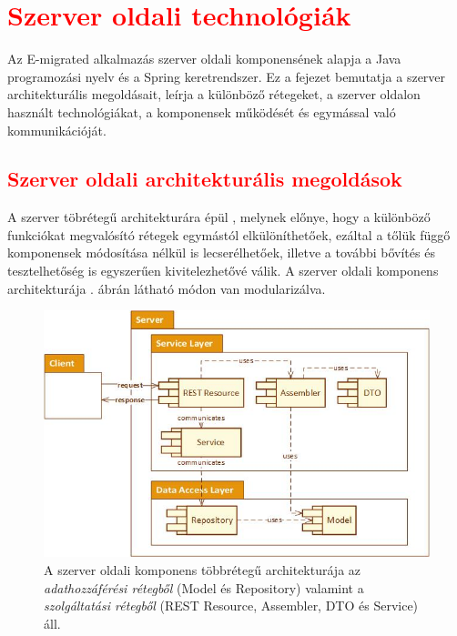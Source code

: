 \chapter{\textcolor{red}{Szerver oldali technológiák}}\label{ch:szerver}

\begin{osszefoglal}
Az E-migrated alkalmazás szerver oldali komponensének alapja a Java programozási nyelv és a Spring keretrendszer. Ez a fejezet bemutatja a szerver architekturális megoldásait, leírja a különböző rétegeket, a szerver oldalon használt technológiákat,  a komponensek működését és egymással való kommunikációját. 
\end{osszefoglal}

\section{\textcolor{red}{Szerver oldali architekturális megoldások}}
\label{sec:szerverArch}

A szerver töbrétegű architekturára épül \cite{MultitierArchitecture}, melynek előnye, hogy a különböző funkciókat megvalósító rétegek egymástól elkülöníthetőek, ezáltal a tőlük függő komponensek módosítása nélkül is lecserélhetőek, illetve a további bővítés és tesztelhetőség is egyszerűen kivitelezhetővé válik. A szerver oldali komponens architekturája . ábrán látható módon van modularizálva. 
\begin{figure}
  \centering
  \includegraphics[width=0.9\linewidth]{images/ServerArchitecture}
  \caption{A szerver oldali komponens többrétegű architekturája  az \textit{adathozzáférési rétegből} (Model és Repository) valamint a \textit{szolgáltatási rétegből} (REST Resource, Assembler, DTO és Service) áll.}
  \label{fig:ServerArchitecture}
\end{figure}

